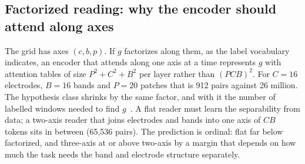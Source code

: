 \subsection{Factorized reading: why the encoder should attend along axes}
\label{sec:factorized}
The grid has axes $(c, b, p)$. If $g$ factorizes along them, as the label vocabulary indicates, an encoder that attends along one axis at a time represents $g$ with attention tables of size $P^2 + C^2 + B^2$ per layer rather than $(PCB)^2$. For $C = 16$ electrodes, $B = 16$ bands and $P = 20$ patches that is 912 pairs against 26 million. The hypothesis class shrinks by the same factor, and with it the number of labelled windows needed to find $g$~\cite{ho2019axial}. A flat reader must learn the separability from data; a two-axis reader that joins electrodes and bands into one axis of $CB$ tokens sits in between (65,536 pairs). The prediction is ordinal: flat far below factorized, and three-axis at or above two-axis by a margin that depends on how much the task needs the band and electrode structure separately.

